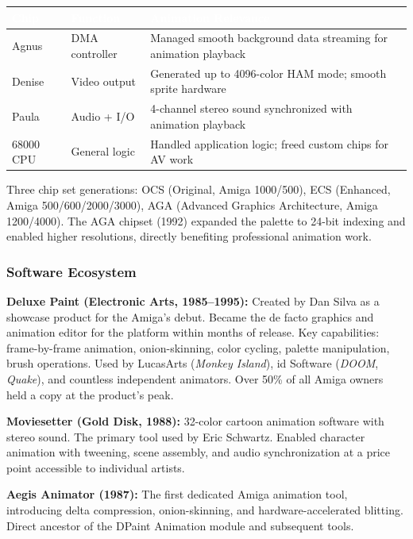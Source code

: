 \documentclass[11pt,letterpaper]{article}
\newcommand{\tableheader}[1]{\textbf{\sffamily\textcolor{white}{#1}}}
\begin{document}
\begin{center}
\begin{tabularx}{\textwidth}{L{2cm}L{2cm}X}
\toprule
{}
\tableheader{Chip} & \tableheader{Function} & \tableheader{Animation Relevance} \\
\midrule
Agnus & DMA controller & Managed smooth background data streaming for animation playback \\
Denise & Video output & Generated up to 4096-color HAM mode; smooth sprite hardware \\
Paula & Audio + I/O & 4-channel stereo sound synchronized with animation playback \\
68000 CPU & General logic & Handled application logic; freed custom chips for AV work \\
\bottomrule
\end{tabularx}
\end{center}

Three chip set generations: OCS (Original, Amiga 1000/500), ECS (Enhanced, Amiga 500/600/2000/3000), AGA (Advanced Graphics Architecture, Amiga 1200/4000). The AGA chipset (1992) expanded the palette to 24-bit indexing and enabled higher resolutions, directly benefiting professional animation work.

\subsubsection{Software Ecosystem}

\textbf{Deluxe Paint (Electronic Arts, 1985--1995):} Created by Dan Silva as a showcase product for the Amiga's debut. Became the de facto graphics and animation editor for the platform within months of release. Key capabilities: frame-by-frame animation, onion-skinning, color cycling, palette manipulation, brush operations. Used by LucasArts (\textit{Monkey Island}), id Software (\textit{DOOM}, \textit{Quake}), and countless independent animators. Over 50\% of all Amiga owners held a copy at the product's peak.

\textbf{Moviesetter (Gold Disk, 1988):} 32-color cartoon animation software with stereo sound. The primary tool used by Eric Schwartz. Enabled character animation with tweening, scene assembly, and audio synchronization at a price point accessible to individual artists.

\textbf{Aegis Animator (1987):} The first dedicated Amiga animation tool, introducing delta compression, onion-skinning, and hardware-accelerated blitting. Direct ancestor of the DPaint Animation module and subsequent tools.
\end{document}
